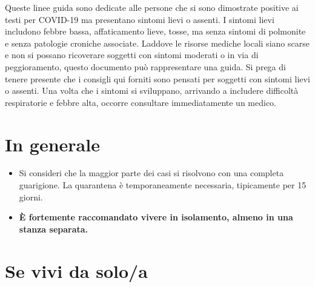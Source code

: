 \documentclass[onecolumn,journal]{IEEEtran}
\begin{document}
\begin{multicols}{2}

Queste linee guida sono dedicate alle persone che si sono dimostrate positive ai testi per COVID-19 ma presentano sintomi lievi o assenti. I sintomi lievi includono febbre bassa, affaticamento lieve, tosse, ma senza sintomi di polmonite e senza patologie croniche associate. Laddove le risorse mediche locali siano scarse e non si possano ricoverare soggetti con sintomi moderati o in via di peggioramento, questo documento può rappresentare una guida. Si prega di tenere presente che i consigli qui forniti sono pensati per soggetti con sintomi lievi o assenti. Una volta che i sintomi si sviluppano, arrivando a includere difficoltà respiratorie e febbre alta, occorre consultare immediatamente un medico.

\section*{In generale}

\begin{itemize}

  \item Si consideri che la maggior parte dei casi si risolvono con una completa guarigione. La quarantena è temporaneamente necessaria, tipicamente per 15 giorni.
  \item \textbf{È fortemente raccomandato vivere in isolamento, almeno in una stanza separata.}

\end{itemize}


\section*{Se vivi da solo/a}

\begin{itemize}


\end{itemize}
\end{multicols}
\end{document}
